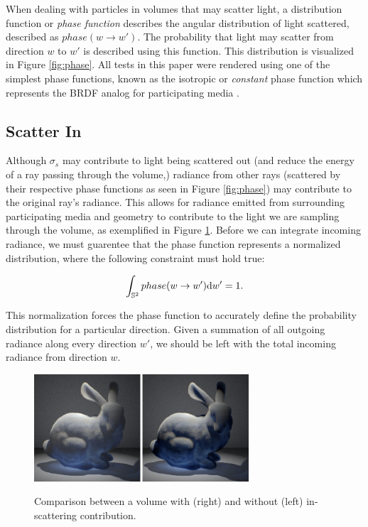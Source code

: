 \documentclass[12pt]{ucthesis}
\newcommand{\captionfonts}{\small\bf\ssp}
\begin{document}
When dealing with particles in volumes that may scatter light, a distribution function or \textit{phase function} describes the angular distribution of light scattered, described as $phase(w \to w')$.  The probability that light may scatter from direction $w$ to $w'$ is described using this function.  This distribution is visualized in Figure \ref{fig:phase}. All tests in this paper were rendered using one of the simplest phase functions, known as the isotropic or \textit{constant} phase function which represents the BRDF analog for participating media \cite{cerezo}.


\subsection{Scatter In}
Although $\sigma_{s}$ may contribute to light being scattered out (and reduce the energy of a ray passing through the volume,) radiance from other rays (scattered by their respective phase functions as seen in Figure \ref{fig:phase}) may contribute to the original ray's radiance.  This allows for radiance emitted from surrounding participating media and geometry to contribute to the light we are sampling through the volume, as exemplified in Figure \ref{fig:inscat_comp}.  Before we can integrate incoming radiance, we must guarentee that the phase function represents a normalized distribution, where the following constraint must hold true:

\begin{equation}
\int_{\mathbb{S}^2}phase(w \to w')\textup{d}w' = 1.
\label{eq:source}
\end{equation}

This normalization forces the phase function to accurately define the probability distribution for a particular direction.  Given a summation of all outgoing radiance along every direction $w'$, we should be left with the total incoming radiance from direction $w$.

\begin{figure}[h!]
    \centering
    \includegraphics[width=80mm]{img/inscat_comp.png}
    \captionfonts
    \caption{Comparison between a volume with (right) and without (left) in-scattering contribution.}
    \label{fig:inscat_comp}
\end{figure}
\end{document}
